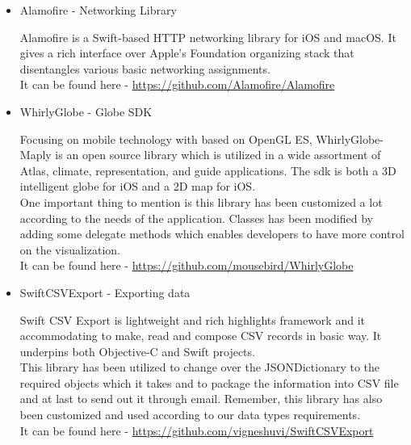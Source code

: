 \begin{itemize}
    \item Alamofire - Networking Library
    
    Alamofire is a Swift-based HTTP networking library for \gls{iOS} and \gls{macOS}. It gives a rich interface over Apple's Foundation organizing stack that disentangles various basic networking assignments.\\
    
    It can be found here - \url{https://github.com/Alamofire/Alamofire} \\
   
    \item WhirlyGlobe - Globe SDK
    
    Focusing on mobile technology with based on OpenGL ES, WhirlyGlobe-Maply is an open source library which is utilized in a wide assortment of Atlas, climate, representation, and guide applications. The \gls{sdk} is both a 3D intelligent globe for \gls{iOS} and a 2D map for \gls{iOS}. \\
    
    One important thing to mention is this library has been customized a lot according to the needs of the application. Classes has been modified by adding some delegate methods which enables developers to have more control on the visualization. \\
    
    It can be found here - \url{https://github.com/mousebird/WhirlyGlobe} \\
    
    \item SwiftCSVExport - Exporting data
    
    Swift CSV Export is lightweight and rich highlights framework and it accommodating to make, read and compose CSV records in basic way. It underpins both Objective-C and Swift projects. \\
    
    This library has been utilized to change over the JSONDictionary to the required objects which it takes and to package the information into CSV file and at last to send out it through email. Remember, this library has also been customized and used according to our data types requirements. \\
    
    It can be found here - \url{https://github.com/vigneshuvi/SwiftCSVExport} \\ 
    
\end{itemize}


